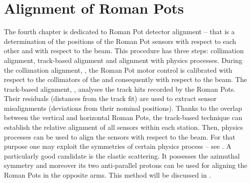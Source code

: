 
\chapter[al]{Alignment of Roman Pots}

The fourth chapter is dedicated to Roman Pot detector alignment -- that is a determination of the positions of the Roman Pot sensors with respect to each other and with respect to the beam. This procedure has three steps: collimation alignment, track-based alignment and alignment with physics processes. During the collimation alignment, , the Roman Pot motor control is calibrated with respect to the collimators of the  and consequently with respect to the beam. The track-based alignment, , analyses the track hits recorded by the Roman Pots. Their residuals (distances from the track fit) are used to extract sensor misalignments (deviations from their nominal positions). Thanks to the overlap between the vertical and horizontal Roman Pots, the track-based technique can establish the relative alignment of all sensors within each station. Then, physics processes can be used to align the sensors with respect to the beam. For that purpose one may exploit the symmetries of certain physics process -- see . A particularly good candidate is the elastic scattering. It possesses the azimuthal symmetry and moreover its two anti-parallel protons can be used for aligning the Roman Pots in the opposite arms. This method will be discussed in .




